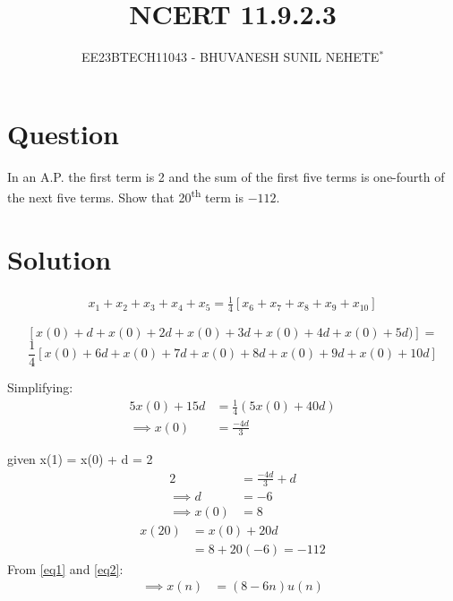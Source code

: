 \documentclass[journal,12pt,twocolumn]{IEEEtran}
\theoremstyle{remark}
\begin{document}

\vspace{3cm}

\title{NCERT 11.9.2.3}
\author{EE23BTECH11043 - BHUVANESH SUNIL NEHETE$^{*}$%
}
\maketitle
\newpage
\bigskip

\renewcommand{\thefigure}{\theenumi}
\renewcommand{\thetable}{\theenumi}



\section*{Question}

In an A.P. the first term is 2 and the sum of the first five terms is one-fourth of the next five terms. Show that 20\textsuperscript{th} term is $-112$.

\section*{Solution}



   \begin{align}
        x_1 + x_2 + x_3 + x_4 + x_5 = \frac{1}{4} [x_6 + x_7 + x_8 + x_9 + x_{10}]
    \end{align}

\[[x(0) + d + x(0) + 2d + x(0) + 3d + x(0) + 4d + x(0) + 5d)] =\]
\[\frac{1}{4} [x(0) + 6d + x(0) + 7d + x(0) + 8d + x(0) + 9d + x(0) + 10d]\]

Simplifying:
    \begin{align}
        5x(0) + 15d &= \frac{1}{4}(5x(0) + 40d)\\
        \implies x(0) &= \frac{-4d}{3}
    \end{align}

    given x(1) = x(0) + d = 2
    \begin{align}
        2 &= \frac{-4d}{3} +d\\
        \implies d &= -6 \label{eq1}\\
        \implies x(0) &= 8 \label{eq2}
    \end{align}
    \begin{align}
        x(20)&=x(0)+20d\\
        &=8+20(-6) = -112
    \end{align}
From \eqref{eq1} and \eqref{eq2}:
    \begin{align}
        \implies x(n)&=(8-6n)u(n)
    \end{align}
    
\end{document}
